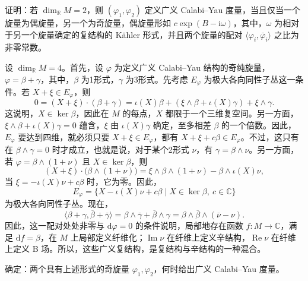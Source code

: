\begin{exercise}\label{exer:6.47}
证明：若 $\dim_{\mathbb R}M=2$，则 $(\varphi_1,\varphi_2)$ 定义广义 Calabi--Yau 度量，当且仅当一个旋量为偶旋量，另一个为奇旋量，偶旋量形如 $c\exp(B-\mathrm i\omega)$，其中，$\omega$ 为相对于另一个旋量确定的复结构的 Kähler 形式，并且两个旋量的配对 $\langle\varphi_i,\overline\varphi_i\rangle$ 之比为非零常数。
\end{exercise}

\begin{example}\label{ex:6.48}
设 $\dim_{\mathbb R}M=4$。首先，设 $\varphi$ 为定义广义 Calabi--Yau 结构的奇纯旋量，$\varphi=\beta+\gamma$，其中，$\beta$ 为1形式，$\gamma$ 为3形式。先考虑 $E_\varphi$ 为极大各向同性子丛这一条件。若 $X+\xi\in E_\varphi$，则
\[
0=(X+\xi)\cdot(\beta+\gamma)
=\iota(X)\beta+(\xi\wedge\beta+\iota(X)\gamma)+\xi\wedge\gamma.
\]
这说明，$X\in\ker\beta$，因此在 $M$ 的每点，$X$ 都限于一个三维复空间。另一方面，$\xi\wedge\beta+\iota(X)\gamma=0$ 蕴含，$\xi$ 由 $\iota(X)\gamma$ 确定，至多相差 $\beta$ 的一个倍数。因此，$E_\varphi$ 要达到四维，就必须只要 $X+\xi\in E_\varphi$，都有 $X+\xi+c\beta\in E_\varphi$。不过，这只有在 $\beta\wedge\gamma=0$ 时才成立，也就是说，对于某个2形式 $\nu$，有 $\gamma=\beta\wedge\nu$。另一方面，若 $\varphi=\beta\wedge(1+\nu)$ 且 $X\in\ker\beta$，则
\[
(X+\xi)\cdot\bigl(\beta\wedge(1+\nu)\bigr)
=\xi\wedge\beta\wedge(1+\nu)-\beta\wedge\iota(X)\nu,
\]
当 $\xi=-\iota(X)\nu+c\beta$ 时，它为零。因此，
\[
E_\varphi=\{X-\iota(X)\nu+c\beta\mid X\in\ker\beta,\ c\in\mathbb C\}
\]
为极大各向同性子丛。现在，
\[
\langle\beta+\gamma,\overline\beta+\overline\gamma\rangle
=\beta\wedge\overline\gamma+\overline\beta\wedge\gamma
=\beta\wedge\overline\beta\wedge(\overline\nu-\nu).
\]
因此，这一配对处处非零与 $\mathrm d\varphi=0$ 的条件说明，局部地存在函数 $f\colon M\to\mathbb C$，满足 $\mathrm df=\beta$，在 $M$ 上局部定义纤维化；$\operatorname{Im}\nu$ 在纤维上定义辛结构，$\operatorname{Re}\nu$ 在纤维上定义 B 场。所以，这些广义复结构，是复结构与辛结构的一种混合。
\end{example}

\begin{exercise}\label{exer:6.49}
确定：两个具有上述形式的奇旋量 $\varphi_1,\varphi_2$，何时给出广义 Calabi--Yau 度量。
\end{exercise}

